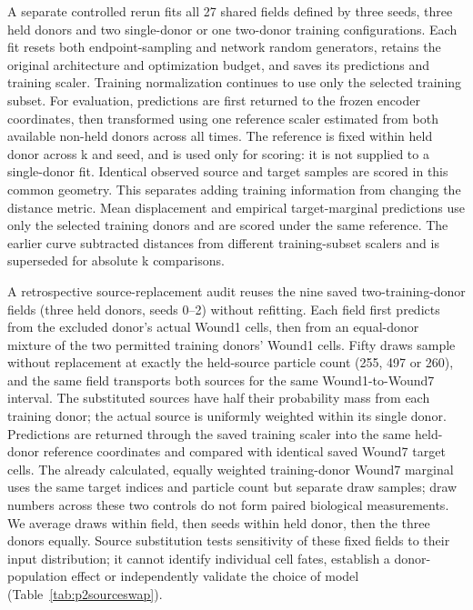 \documentclass[10pt,a4paper]{article}
\begin{document}
A separate controlled rerun fits all 27 shared fields defined by three seeds, three held donors and two single-donor or one two-donor training configurations. Each fit resets both endpoint-sampling and network random generators, retains the original architecture and optimization budget, and saves its predictions and training scaler. Training normalization continues to use only the selected training subset. For evaluation, predictions are first returned to the frozen encoder coordinates, then transformed using one reference scaler estimated from both available non-held donors across all times. The reference is fixed within held donor across k and seed, and is used only for scoring: it is not supplied to a single-donor fit. Identical observed source and target samples are scored in this common geometry. This separates adding training information from changing the distance metric. Mean displacement and empirical target-marginal predictions use only the selected training donors and are scored under the same reference. The earlier curve subtracted distances from different training-subset scalers and is superseded for absolute k comparisons.

A retrospective source-replacement audit reuses the nine saved two-training-donor fields (three held donors, seeds 0--2) without refitting. Each field first predicts from the excluded donor's actual Wound1 cells, then from an equal-donor mixture of the two permitted training donors' Wound1 cells. Fifty draws sample without replacement at exactly the held-source particle count (255, 497 or 260), and the same field transports both sources for the same Wound1-to-Wound7 interval. The substituted sources have half their probability mass from each training donor; the actual source is uniformly weighted within its single donor. Predictions are returned through the saved training scaler into the same held-donor reference coordinates and compared with identical saved Wound7 target cells. The already calculated, equally weighted training-donor Wound7 marginal uses the same target indices and particle count but separate draw samples; draw numbers across these two controls do not form paired biological measurements. We average draws within field, then seeds within held donor, then the three donors equally. Source substitution tests sensitivity of these fixed fields to their input distribution; it cannot identify individual cell fates, establish a donor-population effect or independently validate the choice of model (Table~\ref{tab:p2sourceswap}).
\end{document}
